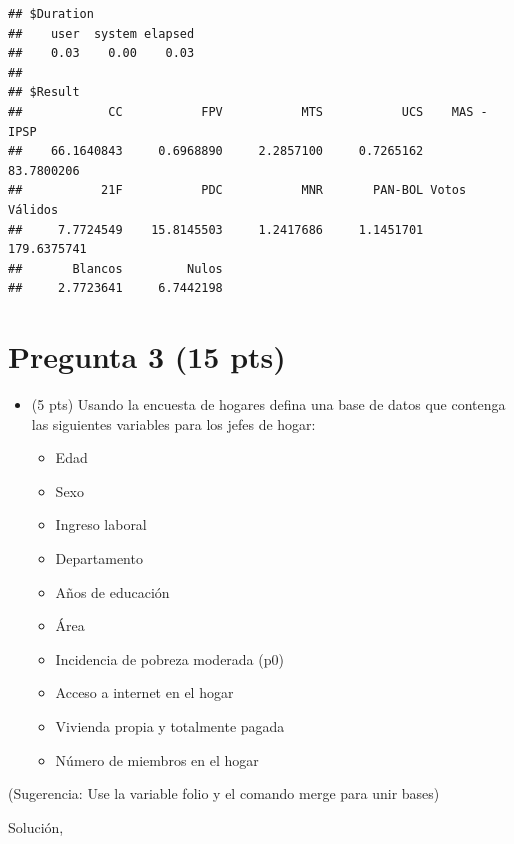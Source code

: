 \documentclass[
]{article}
\providecommand{\tightlist}{%
  \setlength{\itemsep}{0pt}\setlength{\parskip}{0pt}}
\begin{document}
\begin{verbatim}
## $Duration
##    user  system elapsed 
##    0.03    0.00    0.03 
## 
## $Result
##            CC           FPV           MTS           UCS    MAS - IPSP 
##    66.1640843     0.6968890     2.2857100     0.7265162    83.7800206 
##           21F           PDC           MNR       PAN-BOL Votos Válidos 
##     7.7724549    15.8145503     1.2417686     1.1451701   179.6375741 
##       Blancos         Nulos 
##     2.7723641     6.7442198
\end{verbatim}

\hypertarget{pregunta-3-15-pts}{%
\section{Pregunta 3 (15 pts)}\label{pregunta-3-15-pts}}

\begin{itemize}
\tightlist
\item
  (5 pts) Usando la encuesta de hogares defina una base de datos que
  contenga las siguientes variables para los jefes de hogar:

  \begin{itemize}
  \tightlist
  \item
    Edad
  \item
    Sexo
  \item
    Ingreso laboral
  \item
    Departamento
  \item
    Años de educación
  \item
    Área
  \item
    Incidencia de pobreza moderada (p0)
  \item
    Acceso a internet en el hogar
  \item
    Vivienda propia y totalmente pagada
  \item
    Número de miembros en el hogar
  \end{itemize}
\end{itemize}

(Sugerencia: Use la variable folio y el comando merge para unir bases)

Solución,
\end{document}
